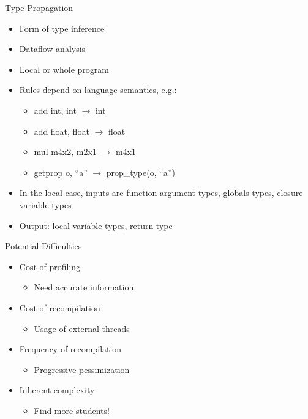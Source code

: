 \begin{frame}{Type Propagation}
    \begin{itemize}
        \item Form of type inference
        \item Dataflow analysis
        \item Local or whole program
        \item Rules depend on language semantics, e.g.:
        \begin{itemize}
            \item add int, int $\rightarrow$ int
            \item add float, float $\rightarrow$ float
            \item mul m4x2, m2x1 $\rightarrow$ m4x1
            \item getprop o, “a” $\rightarrow$ prop\_type(o, “a”)
        \end{itemize}

        \item In the local case, inputs are function argument types, globals types, closure variable types
        \item Output: local variable types, return type
    \end{itemize}
\end{frame}

\begin{frame}{Potential Difficulties}
    \begin{itemize}
        \item Cost of profiling
        \begin{itemize}
            \item Need accurate information
        \end{itemize}
        \item Cost of recompilation
        \begin{itemize}
            \item Usage of external threads
        \end{itemize}
        \item Frequency of recompilation
        \begin{itemize}
            \item Progressive pessimization
        \end{itemize}
        \item Inherent complexity
        \begin{itemize}
            \item Find more students!
        \end{itemize}
    \end{itemize}
\end{frame}

